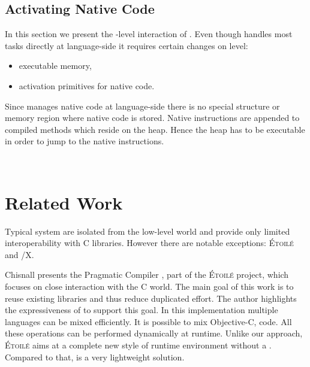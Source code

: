 \subsection{Activating Native Code}

In this section we present the \VM-level interaction of \NB.
Even though \NB handles most tasks directly at language-side it requires certain changes on \VM level:
%
\begin{itemize}[noitemsep]
	\item executable memory,
	\item activation primitives for native code.
\end{itemize}
%
Since \NB manages native code at language-side there is no special structure or memory region where native code is stored.
Native instructions are appended to compiled methods which reside on the heap.
Hence the heap has to be executable in order to jump to the native instructions.

\\

\section{Related Work}

Typical \ST system are isolated from the low-level world and provide only limited interoperability with C libraries.
However there are notable exceptions: \textsc{Étoilé} and \ST/X.

Chisnall presents the Pragmatic \ST Compiler \cite{Chis12a}, part of the \textsc{Étoilé} project, which focuses on close interaction with the C world.
The main goal of this work is to reuse existing libraries and thus reduce duplicated effort.
The author highlights the expressiveness of \ST to support this goal.
In this \ST implementation multiple languages can be mixed efficiently.
It is possible to mix Objective-C, \ST code.
All these operations can be performed dynamically at runtime.
Unlike our approach, \textsc{Étoilé} aims at a complete new style of runtime environment without a \VM.
Compared to that, \NB is a very lightweight solution.

